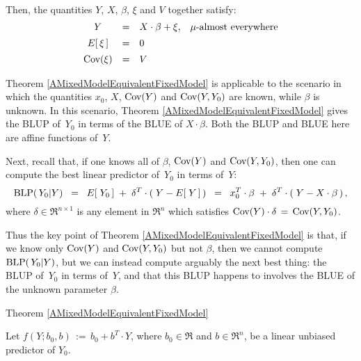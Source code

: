 \begin{theorem}
\begin{itemize}
\begin{eqnarray*}
	\end{eqnarray*}
\end{itemize}
Then, the quantities $Y$, $X$, $\beta$, $\xi$ and $V$ together satisfy:
	\begin{equation*}
	\begin{array}{ccll}
	Y & = & X \cdot \beta + \xi, & \textnormal{$\mu$-almost everywhere}
	\\
	E\!\left[\,\xi\,\right] &\overset{{\color{white}\vert}}{=}& 0
	\\
	\Cov\!\left(\xi\right) &\overset{{\color{white}\vert}}{=}& V
	\end{array}
	\end{equation*}
\end{theorem}

\begin{remark}
\mbox{}
\vskip 0.05cm
\noindent
Theorem \ref{AMixedModelEquivalentFixedModel} is applicable to the scenario in which
the quantities $x_{0}$, $X$, $\textnormal{Cov}(Y)$ and $\textnormal{Cov}(Y,Y_{0})$ are {\color{red}known}, while
{\color{red}$\beta$ is unknown}.
In this scenario, Theorem \ref{AMixedModelEquivalentFixedModel} gives the BLUP of
\,$Y_{0}$ in terms of the BLUE of $X\cdot\beta$.
Both the BLUP and BLUE here are affine functions of \,$Y$.

Next, recall that, if one knows all of $\beta$, $\textnormal{Cov}(Y)$ and $\textnormal{Cov}(Y,Y_{0})$, then one can compute
the best linear predictor of \,$Y_{0}$ in terms of \,$Y$:
\begin{equation*}
\textnormal{BLP}(\,Y_{0}\vert Y)
\;\; = \;\;
	E\!\left[\;Y_{0}\,\right] \; + \; \delta^{T}\cdot(\;Y - E\!\left[\;Y\,\right]\,)
\;\; = \;\;
	x_{0}^{T}\cdot\beta \; + \; \delta^{T}\cdot(\;Y - X\cdot\beta\,)\,,
\end{equation*}
where $\delta \in \Re^{n \times 1}$ is any element in $\Re^{n}$ which satisfies
$\textnormal{Cov}(Y) \cdot \delta \,=\, \textnormal{Cov}(Y,Y_{0})$.

Thus the key point of Theorem \ref{AMixedModelEquivalentFixedModel} is that,
if we know only $\textnormal{Cov}(Y)$ and $\textnormal{Cov}(Y,Y_{0})$ but not $\beta$, then we cannot
compute $\textnormal{BLP}(\,Y_{0}\vert Y)$, but we can instead compute arguably the next best thing:
the BLUP of \,$Y_{0}$ in terms of \,$Y$, and that this BLUP happens to involves
the BLUE of the unknown parameter $\beta$.
\end{remark}

\proofof Theorem \ref{AMixedModelEquivalentFixedModel}

\vskip 0.3cm
\noindent
Let $f(Y;b_{0},b) \,:=\, b_{0} + b^{T}\cdot Y$, where $b_{0} \in \Re$ and $b \in \Re^{n}$, be a linear unbiased predictor of $Y_{0}$.

